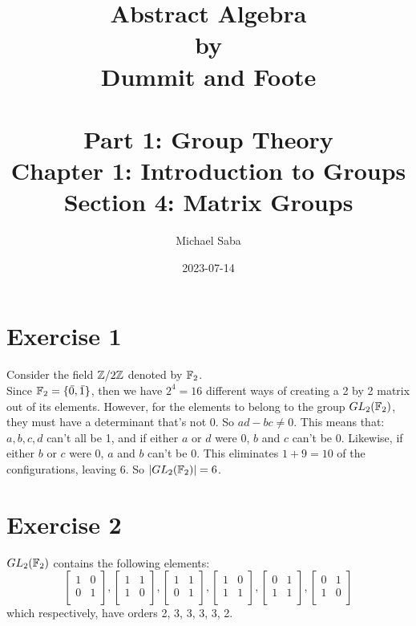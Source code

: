 \documentclass[12pt]{article}
\title{%
    \Huge Abstract Algebra \\
    \large by \\
    \Large Dummit and Foote \\~\\
    \huge Part 1: Group Theory \\
    \LARGE Chapter 1: Introduction to Groups \\
    \Large Section 4: Matrix Groups
}
\date{2023-07-14}
\author{Michael Saba}
\begin{document}
    \maketitle
    \newpage
    \setlength{\parindent}{0pt}


    \section*{Exercise 1}
    Consider the field $\mathbb{Z}/2\mathbb{Z}$ denoted by $\mathbb{F}_2$. \\
    Since $\mathbb{F}_2 = \{\,\overline{\!{0}}, \,\overline{\!{1}}\}$,
    then we have $2^4 = 16$ different ways of creating a 2 by 2 matrix out of its
    elements.
    However, for the elements to belong to the group $GL_2(\mathbb{F}_2)$,
    they must have a determinant that's not 0.
    So $ad - bc \neq 0$. This means that: \\
    $a, b, c, d$ can't all be 1,
    and if either $a$ or $d$ were 0, $b$ and $c$ can't be 0.
    Likewise, if either $b$ or $c$ were 0, $a$ and $b$ can't be 0.
    This eliminates $1 + 9 = 10$ of the configurations, leaving 6.
    So $|GL_2(\mathbb{F}_2)| = 6$.


    \section*{Exercise 2}
    $GL_2(\mathbb{F}_2)$ contains the following elements: \\
    \[ \begin{bmatrix}
        1 & 0 \\
        0 & 1 \\
    \end{bmatrix},
    \begin{bmatrix}
        1 & 1 \\
        1 & 0 \\
    \end{bmatrix},
    \begin{bmatrix}
        1 & 1 \\
        0 & 1 \\
    \end{bmatrix},
    \begin{bmatrix}
        1 & 0 \\
        1 & 1 \\
    \end{bmatrix},
    \begin{bmatrix}
        0 & 1 \\
        1 & 1 \\
    \end{bmatrix},
    \begin{bmatrix}
        0 & 1 \\
        1 & 0 \\
    \end{bmatrix} \]
    which respectively, have orders 2, 3, 3, 3, 3, 2.
\end{document}
